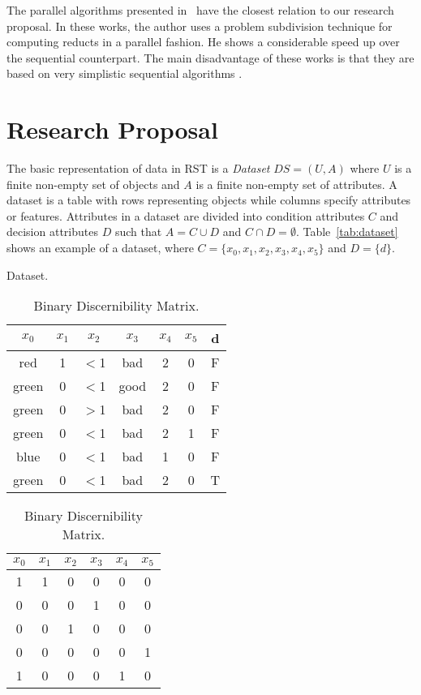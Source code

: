 \documentclass[citenumber]{elsarticle}
\begin{document}
	The parallel algorithms presented in~\cite{Susmaga1998,Susmaga2004} have the closest relation to our research proposal. In these works, the author uses a problem subdivision technique for computing reducts in a parallel fashion. He shows a considerable speed up over the sequential counterpart. The main disadvantage of these works is that they are based on very simplistic sequential algorithms \cite{Skowron92,susmaga1998effective}. 
%
\section{Research Proposal}\label{Proposal} 
%    
	The basic representation of data in RST is a \emph{Dataset} $DS=(U,A)$ where $U$ is a finite non-empty set of objects and $A$ is a finite non-empty set of attributes. A dataset is a table with rows representing objects while columns specify attributes or features. Attributes in a dataset are divided into condition attributes $C$ and decision attributes $D$ such that $A=C \cup D$ and $C \cap D =\emptyset$. Table~\ref{tab:dataset} shows an example of a dataset, where $C=\lbrace x_0,x_1,x_2,x_3,x_4,x_5 \rbrace$ and $D=\lbrace d \rbrace$.

	\begin{table}[htb]
		\begin{minipage}{.4\linewidth}
			\caption{Dataset.} \label{tab:dataset}
			\centering
		 	\begin{tabular}{cccccc|c}
		 		$x_0$ & $x_1$ & $x_2$ & $x_3$ & $x_4$ & $x_5$ & d \\
		 		\hline
				red   & 1 & $<$1 & bad  & 2 & 0 & F \\
				green & 0 & $<$1 & good & 2 & 0 & F \\
				green & 0 & $>$1 & bad  & 2 & 0 & F \\
				green & 0 & $<$1 & bad  & 2 & 1 & F \\
				blue  & 0 & $<$1 & bad  & 1 & 0 & F \\
				green & 0 & $<$1 & bad  & 2 & 0 & T
		 	\end{tabular}       
		\end{minipage}  
		\begin{minipage}{.59\linewidth}
			\caption{Binary Discernibility Matrix.} \label{tab:SBDM}
			\centering
			\begin{tabular}{cccccc}
				$x_0$ & $x_1$ & $x_2$ & $x_3$ & $x_4$ & $x_5$ \\
				\hline
				1 & 1 & 0 & 0 & 0 & 0 \\
				0 & 0 & 0 & 1 & 0 & 0 \\
				0 & 0 & 1 & 0 & 0 & 0 \\
				0 & 0 & 0 & 0 & 0 & 1 \\
				1 & 0 & 0 & 0 & 1 & 0
			\end{tabular}       
			\bigskip
		\end{minipage}    
 	\end{table}
 
\end{document}
